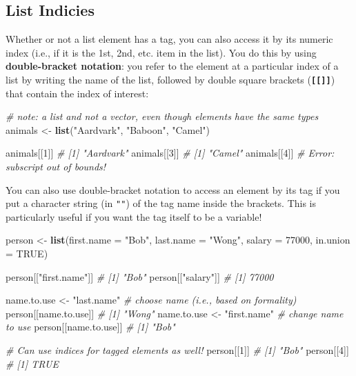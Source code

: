 \documentclass[]{book}
\newenvironment{Shaded}{\begin{snugshade}}{\end{snugshade}}
\newcommand{\KeywordTok}[1]{\textcolor[rgb]{0.13,0.29,0.53}{\textbf{#1}}}
\newcommand{\DataTypeTok}[1]{\textcolor[rgb]{0.13,0.29,0.53}{#1}}
\newcommand{\DecValTok}[1]{\textcolor[rgb]{0.00,0.00,0.81}{#1}}
\newcommand{\StringTok}[1]{\textcolor[rgb]{0.31,0.60,0.02}{#1}}
\newcommand{\CommentTok}[1]{\textcolor[rgb]{0.56,0.35,0.01}{\textit{#1}}}
\newcommand{\OtherTok}[1]{\textcolor[rgb]{0.56,0.35,0.01}{#1}}
\newcommand{\NormalTok}[1]{#1}
\theoremstyle{definition}
\theoremstyle{definition}
\theoremstyle{remark}
\begin{document}
\subsection{List Indicies}\label{list-indicies}

Whether or not a list element has a tag, you can also access it by its
numeric index (i.e., if it is the 1st, 2nd, etc. item in the list). You
do this by using \textbf{double-bracket notation}: you refer to the
element at a particular index of a list by writing the name of the list,
followed by double square brackets (\textbf{\texttt{{[}{[}{]}{]}}}) that
contain the index of interest:

\begin{Shaded}
\begin{Highlighting}[]
\CommentTok{# note: a list and not a vector, even though elements have the same types}
\NormalTok{animals <-}\StringTok{ }\KeywordTok{list}\NormalTok{(}\StringTok{"Aardvark"}\NormalTok{, }\StringTok{"Baboon"}\NormalTok{, }\StringTok{"Camel"}\NormalTok{)}

\NormalTok{animals[[}\DecValTok{1}\NormalTok{]]  }\CommentTok{# [1] "Aardvark"}
\NormalTok{animals[[}\DecValTok{3}\NormalTok{]]  }\CommentTok{# [1] "Camel"}
\NormalTok{animals[[}\DecValTok{4}\NormalTok{]]  }\CommentTok{# Error: subscript out of bounds!}
\end{Highlighting}
\end{Shaded}

You can also use double-bracket notation to access an element by its tag
if you put a character string (in \texttt{""}) of the tag name inside
the brackets. This is particularly useful if you want the tag itself to
be a variable!

\begin{Shaded}
\begin{Highlighting}[]
\NormalTok{person <-}\StringTok{ }\KeywordTok{list}\NormalTok{(}\DataTypeTok{first.name =} \StringTok{"Bob"}\NormalTok{, }\DataTypeTok{last.name =} \StringTok{"Wong"}\NormalTok{, }\DataTypeTok{salary =} \DecValTok{77000}\NormalTok{, }\DataTypeTok{in.union =} \OtherTok{TRUE}\NormalTok{)}

\NormalTok{person[[}\StringTok{"first.name"}\NormalTok{]]  }\CommentTok{# [1] "Bob"}
\NormalTok{person[[}\StringTok{"salary"}\NormalTok{]]  }\CommentTok{# [1] 77000}

\NormalTok{name.to.use <-}\StringTok{ "last.name"}  \CommentTok{# choose name (i.e., based on formality)}
\NormalTok{person[[name.to.use]]  }\CommentTok{# [1] "Wong"}
\NormalTok{name.to.use <-}\StringTok{ "first.name"}  \CommentTok{# change name to use}
\NormalTok{person[[name.to.use]]  }\CommentTok{# [1] "Bob"}

\CommentTok{# Can use indices for tagged elements as well!}
\NormalTok{person[[}\DecValTok{1}\NormalTok{]]  }\CommentTok{# [1] "Bob"}
\NormalTok{person[[}\DecValTok{4}\NormalTok{]]  }\CommentTok{# [1] TRUE}
\end{Highlighting}
\end{Shaded}
\end{document}
